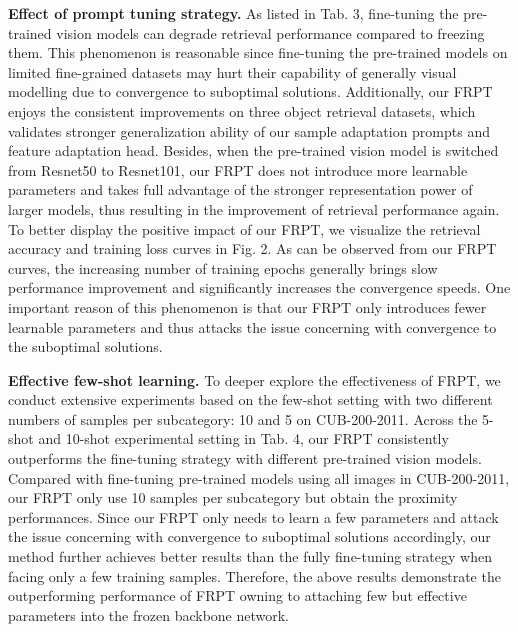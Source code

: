 \documentclass[letterpaper]{article} %
\begin{document}
\textbf{Effect of prompt tuning strategy.} As listed in Tab. 3, fine-tuning the pre-trained vision models can degrade retrieval performance compared to freezing them. This phenomenon is reasonable since fine-tuning the pre-trained models on limited fine-grained datasets may hurt their capability of generally visual modelling due to convergence to suboptimal solutions. 
Additionally, our FRPT enjoys the consistent improvements on three object retrieval datasets, which validates stronger generalization ability of our sample adaptation prompts and feature adaptation head. Besides, when the pre-trained vision model is switched from Resnet50 to Resnet101, our FRPT does not introduce more learnable parameters and takes full advantage of the stronger representation power of larger models, thus resulting in the improvement of retrieval performance again.
To better display the positive impact of our FRPT, we visualize the retrieval accuracy and training loss curves in Fig. 2. As can be observed from our FRPT curves, the increasing number of training epochs generally brings slow performance improvement and significantly increases the convergence speeds. One important reason of this phenomenon is that our FRPT only introduces fewer learnable parameters and thus attacks the issue concerning with convergence to the suboptimal solutions.

\textbf{Effective few-shot learning.} To deeper explore the effectiveness of FRPT, we conduct extensive experiments based on the few-shot setting with two different numbers of samples per subcategory: 10 and 5 on CUB-200-2011. Across the 5-shot and 10-shot experimental setting in Tab. 4, our FRPT consistently outperforms the fine-tuning strategy with different pre-trained vision models. Compared with fine-tuning pre-trained models using all images in CUB-200-2011, our FRPT only use 10 samples per subcategory but obtain the proximity performances. Since our FRPT only needs to learn a few parameters and attack the issue concerning with convergence to suboptimal solutions accordingly, our method further achieves better results than the fully fine-tuning strategy when facing only a few training samples. Therefore, the above results demonstrate the outperforming performance of FRPT owning to attaching few but effective parameters into the frozen backbone network.
\end{document}
